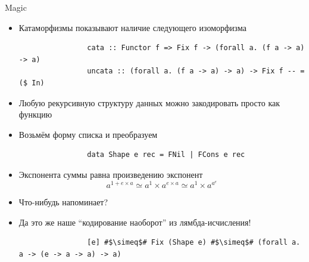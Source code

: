     \begin{frame}[fragile]{Magic \advancedslide}
        \begin{itemize}
            \item Катаморфизмы показывают наличие следующего изоморфизма
            \begin{verbatim}
                cata :: Functor f => Fix f -> (forall a. (f a -> a) -> a)
                uncata :: (forall a. (f a -> a) -> a) -> Fix f -- = ($ In)
            \end{verbatim}
            \item[\then] Любую рекурсивную структуру данных можно закодировать просто как функцию
            \item Возьмём форму списка и преобразуем
            \begin{verbatim}
                data Shape e rec = FNil | FCons e rec
            \end{verbatim}
            \item[\then] Экспонента суммы равна произведению экспонент \[a^{1 + e\times a} \simeq a^1\times a^{e\times a} \simeq a^1\times a^{a^e}\]
            \item[\todo] Что-нибудь напоминает?
            \item[\answer] \pause Да это же наше ``кодирование наоборот'' из лямбда-исчисления!
            \begin{verbatim}
                [e] #$\simeq$# Fix (Shape e) #$\simeq$# (forall a. a -> (e -> a -> a) -> a)
            \end{verbatim}
        \end{itemize}
    \end{frame}


